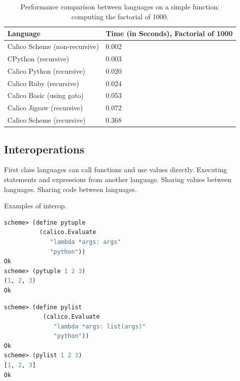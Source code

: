 \documentclass[preprint]{sigplanconf}
\begin{document}
\begin{table}[h]\footnotesize
  \centering
  \begin{tabular}{ l | l }
    \hline                        
    \textbf{Language} & \textbf{Time (in Seconds), Factorial of 1000} \\
    \hline                        
    Calico Scheme (non-recursive) & 0.002 \\
    CPython (recursive)           & 0.003 \\
    Calico Python (recursive)     & 0.020 \\
    Calico Ruby (recursive)       & 0.024 \\
    Calico Basic (using goto)     & 0.053 \\
    Calico Jigsaw (recursive)     & 0.072 \\
    Calico Scheme (recursive)     & 0.368 \\
  \end{tabular}
  \caption{Performance comparison between languages on a simple
    function: computing the factorial of 1000.}
  \label{performance}
\end{table}

\subsection{Interoperations}

First class languages can call functions and use values
directly. Executing statements and expressions from another language.
Sharing values between languages.  Sharing code between languages.

Examples of interop.

\begin{lstlisting}[language=Lisp, morekeywords={define}, caption={Defining a function \texttt{pytuple} in 
      Calico Scheme that directly uses Calico Python's lambda to construct a Python tuple. Notice     
      that in line 7 that the tuple's representation reflects the style
      from Python.}, label={scheme1}]
scheme> (define pytuple 
          (calico.Evaluate 
             "lambda *args: args" 
             "python"))
Ok
scheme> (pytuple 1 2 3)
(1, 2, 3)
Ok
\end{lstlisting}


\begin{lstlisting}[language=Lisp, morekeywords={define}, caption={Defining a funtion \texttt{pylist} in Calico Scheme that creates a
    Python list.}, label={scheme2}]
scheme> (define pylist 
           (calico.Evaluate 
              "lambda *args: list(args)" 
              "python"))
Ok
scheme> (pylist 1 2 3)
[1, 2, 3]
Ok
\end{lstlisting}
\end{document}
